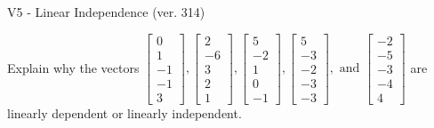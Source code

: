\begin{exercise}
  \begin{exerciseTitle}V5 - Linear Independence (ver. 314)\end{exerciseTitle}
  \begin{exerciseStatement}
    Explain why the vectors \(\left[\begin{array}{r}
0 \\
1 \\
-1 \\
-1 \\
3
\end{array}\right] , \left[\begin{array}{r}
2 \\
-6 \\
3 \\
2 \\
1
\end{array}\right] , \left[\begin{array}{r}
5 \\
-2 \\
1 \\
0 \\
-1
\end{array}\right] , \left[\begin{array}{r}
5 \\
-3 \\
-2 \\
-3 \\
-3
\end{array}\right] , \text{ and } \left[\begin{array}{r}
-2 \\
-5 \\
-3 \\
-4 \\
4
\end{array}\right]\) are linearly dependent or linearly independent.	



\end{exerciseStatement}
\end{exercise}
